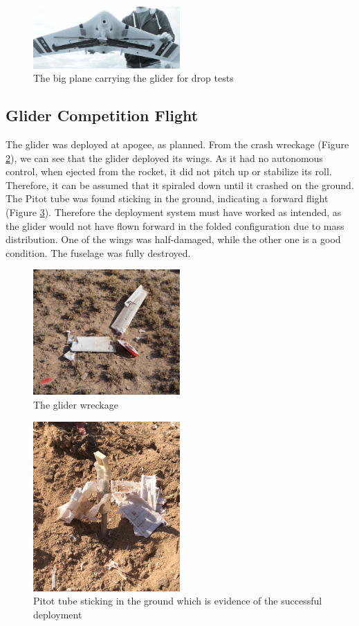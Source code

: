 \begin{figure}[h!]
    \centering
        \includegraphics[width=0.5\textwidth]{img/prototype2.jpg}
        \caption{The big plane carrying the glider for drop tests}
        \label{f:prot2}
 \end{figure}

\subsection{Glider Competition Flight}

The glider was deployed at apogee, as planned. From the crash wreckage (Figure \ref{f:crash}), we can see that the glider deployed its wings. As it had no autonomous control, when ejected from the rocket, it did not pitch up or stabilize its roll. Therefore, it can be assumed that it spiraled down until it crashed on the ground. The Pitot tube was found sticking in the ground, indicating a forward flight (Figure \ref{f:pitot_in_sand}). Therefore the deployment system must have worked as intended, as the glider would not have flown forward in the folded configuration due to mass distribution. One of the wings was half-damaged, while the other one is a good condition. The fuselage was fully destroyed.


\begin{figure}[h!]
    \centering
        \includegraphics[width=0.5\textwidth]{img/crash.jpg}
        \caption{The glider wreckage}
        \label{f:crash}
 \end{figure}

\begin{figure}[h!]
    \centering
        \includegraphics[width=0.5\textwidth]{img/pitot-tube-sticking-in-sand.jpg}
        \caption{Pitot tube sticking in the ground which is evidence of the successful deployment}
        \label{f:pitot_in_sand}
 \end{figure}
